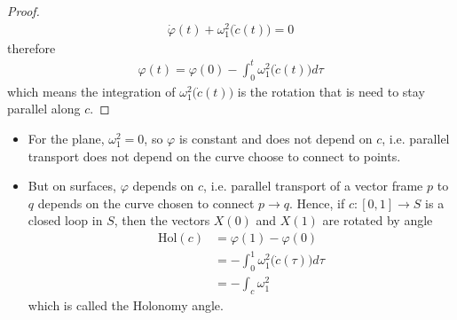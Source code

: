 \documentclass[10pt]{article}
\begin{document}
\begin{proof}
\begin{equation*}
\begin{aligned}
                        \dot{\varphi}(t) + \omega_1^2\big(\dot{c}(t)\big) = 0
                    \end{aligned}
                \end{equation*}
                therefore
                \begin{equation*}
                    \begin{aligned}
                        \varphi(t) = \varphi(0) - \int_0^t\omega_1^2\big(\dot{c}(t)\big)d\tau
                    \end{aligned}
                \end{equation*}
                which means the integration of $\omega_1^2\big(\dot{c}(t)\big)$ is the rotation that is need to stay parallel along $c$.
            \end{proof}
            \begin{remark}
                \begin{itemize}
                    \item For the plane, $\omega_1^2 = 0$, so $\varphi$ is constant and does not depend on $c$, i.e. parallel transport does not depend on the curve choose to connect to points.
                    \item But on surfaces, $\varphi$ depends on $c$, i.e. parallel transport of a vector frame $p$ to $q$ depends on the curve chosen to connect $p\rightarrow q$. Hence, if $c: [0,1]\rightarrow S$ is a closed loop in $S$, then the vectors $X(0)$ and $X(1)$ are rotated by angle
                    \begin{equation*}
                        \begin{aligned}
                            \text{Hol}(c) &= \varphi(1) - \varphi(0) \\
                            &= -\int_0^1\omega_1^2\big(\dot{c}(\tau)\big)d\tau \\
                            &= -\int_c\omega_1^2
                        \end{aligned}
                    \end{equation*}
                    which is called the Holonomy angle.
                \end{itemize}
            \end{remark}
            
            
            
            
            
                        
            
            
            
\end{document}
